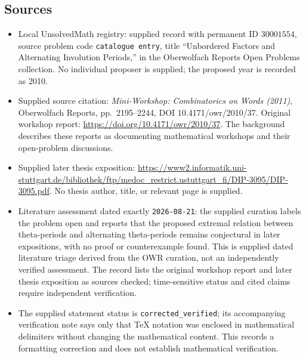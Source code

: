 \documentclass[11pt]{article}
\begin{document}
\subsection{Sources}
\begin{itemize}
\item Local UnsolvedMath registry: supplied record with permanent ID \(30001554\), source problem code \texttt{catalogue entry}, title ``Unbordered Factors and Alternating Involution Periods,'' in the Oberwolfach Reports Open Problems collection. No individual proposer is supplied; the proposed year is recorded as 2010.
\item Supplied source citation: \emph{Mini-Workshop: Combinatorics on Words (2011)}, Oberwolfach Reports, pp.\ 2195--2244, DOI 10.4171/owr/2010/37. Original workshop report: \url{https://doi.org/10.4171/owr/2010/37}. The background describes these reports as documenting mathematical workshops and their open-problem discussions.
\item Supplied later thesis exposition: \url{https://www2.informatik.uni-stuttgart.de/bibliothek/ftp/medoc_restrict.ustuttgart_fi/DIP-3095/DIP-3095.pdf}. No thesis author, title, or relevant page is supplied.
\item Literature assessment dated exactly \texttt{2026-08-21}: the supplied curation labels the problem open and reports that the proposed extremal relation between theta-periods and alternating theta-periods remains conjectural in later expositions, with no proof or counterexample found. This is supplied dated literature triage derived from the OWR curation, not an independently verified assessment. The record lists the original workshop report and later thesis exposition as sources checked; time-sensitive status and cited claims require independent verification.
\item The supplied statement status is \texttt{corrected\_verified}; its accompanying verification note says only that TeX notation was enclosed in mathematical delimiters without changing the mathematical content. This records a formatting correction and does not establish mathematical verification.
\end{itemize}
\end{document}
